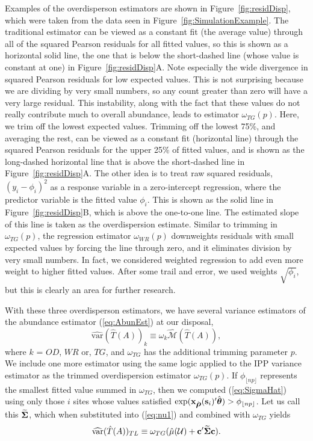\documentclass[12pt, titlepage]{article}\usepackage[]{graphicx}\usepackage[]{color}
\newcommand{\bx}{\ensuremath{\mathbf{x}}}
\newcommand{\bs}{\ensuremath{\mathbf{s}}}
\def\bc{\mathbf{c}}
\def\bs{\mathbf{s}}
\def\cU{\mathcal{U}}
\def\cM{\mathcal{M}}
\def\btheta{\mbox{\boldmath $\theta$}}
\def\brho{\mbox{\boldmath $\rho$}}
\def\bSigma{\mbox{\boldmath $\Sigma$}}
\def\var{\textrm{var}}
\begin{document}
Examples of the overdisperson estimators are shown in Figure~\ref{fig:residDisp}, which were taken from the data seen in Figure~\ref{fig:SimulationExample}.  The traditional estimator can be viewed as a constant fit (the average value) through all of the squared Pearson residuals for all fitted values, so this is shown as a horizontal solid line, the one that is below the short-dashed line (whose value is constant at one) in Figure~\ref{fig:residDisp}A.  Note especially the wide divergence in squared Pearson residuals for low expected values.  This is not surprising because we are dividing by very small numbers, so any count greater than zero will have a very large residual.  This instability, along with the fact that these values do not really contribute much to overall abundance, leads to estimator $\omega_{TG}(p)$.  Here, we trim off the lowest expected values.  Trimming off the lowest 75\%, and averaging the rest, can be viewed as a constant fit (horizontal line) through the squared Pearson residuals for the upper 25\% of fitted values, and is shown as the long-dashed horizontal line that is above the short-dashed line in Figure~\ref{fig:residDisp}A.  The other idea is to treat raw squared residuals, $(y_i - \phi_i)^2$ as a response variable in a zero-intercept regression, where the predictor variable is the fitted value $\phi_i$.  This is shown as the solid line in Figure~\ref{fig:residDisp}B, which is above the one-to-one line.  The estimated slope of this line is taken as the overdispersion estimate.  Similar to trimming in $\omega_{TG}(p)$, the regression estimator $\omega_{WR}(p)$ downweights residuals with small expected values by forcing the line through zero, and it eliminates division by very small numbers. In fact, we considered weighted regression to add even more weight to higher fitted values.  After some trail and error, we used weights $\sqrt{\phi_i}$, but this is clearly an area for further research.

With these three overdisperson estimators, we have several variance estimators of the abundance estimator (\ref{eq:AbunEst}) at our disposal, 
\begin{equation} \label{eq:vkk}
  \widehat{\var}(\hat{T}(A))_k \equiv \omega_k\hat{\cM}(\hat{T}(A)), 
\end{equation}
where $k$ = $OD$, $WR$ or, $TG$, and $\omega_{TG}$ has the additional trimming parameter $p$. We include one more estimator using the same logic applied to the IPP variance estimator as the trimmed overdispersion estimator $\omega_{TG}(p)$.  If $\phi_{\lfloor np \rfloor}$ represents the smallest fitted value summed in $\omega_{TG}$, then we computed (\ref{eq:SigmaHat}) using only those $i$ sites whose values satisfied $\exp(\bx_{\hat{\brho}}(\bs_i)^\prime\hat{\btheta}) >\phi_{\lfloor np \rfloor}$. Let us call this $\widetilde{\bSigma}$, which when substituted into (\ref{eq:nu1}) and combined with $\omega_{TG}$ yields
\begin{equation} \label{eq:vTL}
  \widehat{\var}(\hat{T}(A))_{TL} \equiv \omega_{TG}(\hat{\mu}(\cU) + \bc^\prime\widetilde{\bSigma}\bc). 
\end{equation}
\end{document}
